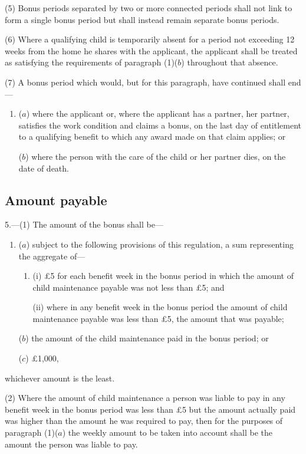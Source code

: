 \documentclass[a4paper]{article}
\begin{document}
(5) Bonus periods separated by two or more connected periods shall not link to form a single bonus period but shall instead remain separate bonus periods.

(6) Where a qualifying child is temporarily absent for a period not exceeding 12 weeks from the home he shares with the applicant, the applicant shall be treated as satisfying the requirements of paragraph (1)($b$) throughout that absence.

(7) A bonus period which would, but for this paragraph, have continued shall end—
\begin{enumerate}\item[]
($a$) where the applicant or, where the applicant has a partner, her partner, satisfies the work condition and claims a bonus, on the last day of entitlement to a qualifying benefit to which any award made on that claim applies; or

($b$) where the person with the care of the child or her partner dies, on the date of death.
\end{enumerate}

\subsection[5. Amount payable]{Amount payable}

5.—(1) The amount of the bonus shall be—
\begin{enumerate}\item[]
($a$) subject to the following provisions of this regulation, a sum representing the aggregate of—
\begin{enumerate}\item[]
(i) £5 for each benefit week in the bonus period in which the amount of child maintenance payable was not less than £5; and

(ii) where in any benefit week in the bonus period the amount of child maintenance payable was less than £5, the amount that was payable;
\end{enumerate}

($b$) the amount of the child maintenance paid in the bonus period; or

($c$) £1,000,
\end{enumerate}
whichever amount is the least.

(2) Where the amount of child maintenance a person was liable to pay in any benefit week in the bonus period was less than £5 but the amount actually paid was higher than the amount he was required to pay, then for the purposes of paragraph (1)($a$) the weekly amount to be taken into account shall be the amount the person was liable to pay.
\end{document}
